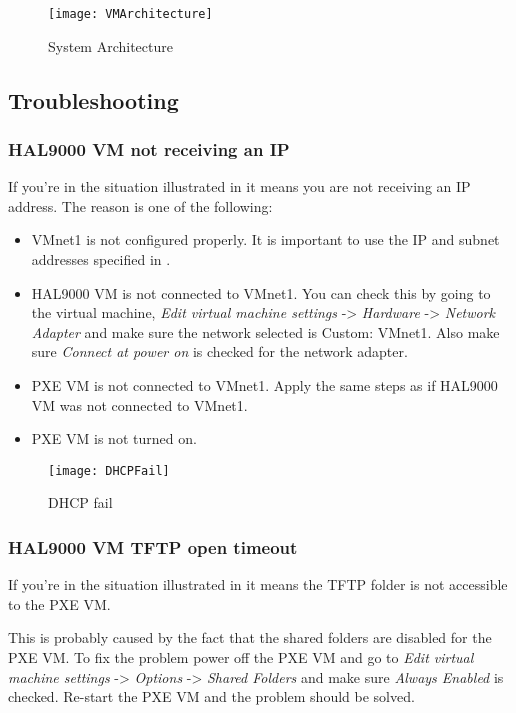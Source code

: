 \begin{appendices}
\begin{figure}
	\centering
	\texttt{[image: VMArchitecture]}
		\caption{System Architecture}
	\label{fig:SystemArch}
\end{figure}

\subsection{Troubleshooting}

\subsubsection{HAL9000 VM not receiving an IP}

If you're in the situation illustrated in  it means you are not receiving an
IP address. The reason is one of the following:
\begin{itemize}
	\item VMnet1 is not configured properly. It is important to use the IP and subnet addresses
specified in .

	\item HAL9000 VM is not connected to VMnet1. You can check this by going to the virtual machine,
\textit{Edit virtual machine settings} -> \textit{Hardware} -> \textit{Network Adapter} and make
sure the network selected is Custom: VMnet1. Also make sure \textit{Connect at power on} is checked
for the network adapter.

	\item PXE VM is not connected to VMnet1. Apply the same steps as if HAL9000 VM was not connected
to VMnet1.

	\item PXE VM is not turned on.
\end{itemize}

\begin{figure}
	\centering
	\texttt{[image: DHCPFail]}
		\caption{DHCP fail}
	\label{fig:DHCPFail}
\end{figure}

\subsubsection{HAL9000 VM TFTP open timeout}

If you're in the situation illustrated in  it means the TFTP folder is not
accessible to the PXE VM.

This is probably caused by the fact that the shared folders are disabled for the PXE VM. To fix the
problem power off the PXE VM and go to \textit{Edit virtual machine settings} -> \textit{Options} ->
\textit{Shared Folders} and make sure \textit{Always Enabled} is checked. Re-start the PXE VM and the
problem should be solved.


\end{appendices}
